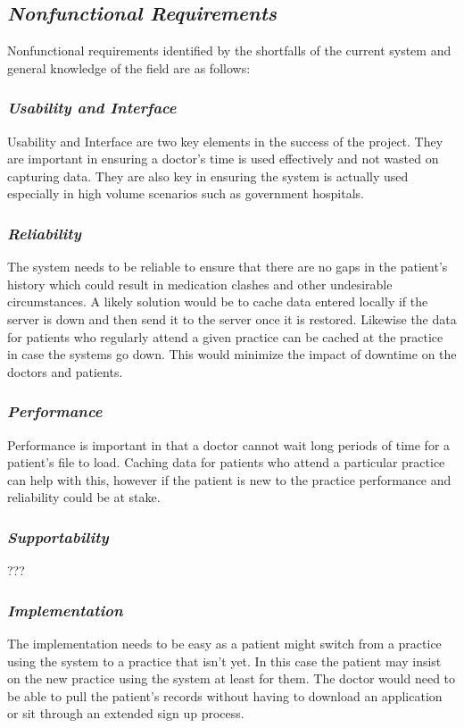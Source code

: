 \documentclass[a4paper]{article}
\begin{document}
\subsection{\textit{Nonfunctional Requirements}}
Nonfunctional requirements identified by the shortfalls of the current system and general knowledge of the field are as follows:
	\subsubsection{\textit{Usability and Interface}}
	Usability and Interface are two key elements in the success of the project. They are important in ensuring a doctor's time is used effectively and not wasted on capturing data. They are also key in ensuring the system is actually used especially in high volume scenarios such as government hospitals.
	
	\subsubsection{\textit{Reliability}}
	The system needs to be reliable to ensure that there are no gaps in the patient's history which could result in medication clashes and other undesirable circumstances. A likely solution would be to cache data entered locally if the server is down and then send it to the server once it is restored. Likewise the data for patients who regularly attend a given practice can be cached at the practice in case the systems go down. This would minimize the impact of downtime on the doctors and patients.
	
	\subsubsection{\textit{Performance}}
	Performance is important in that a doctor cannot wait long periods of time for a patient's file to load. Caching data for patients who attend a particular practice can help with this, however if the patient is new to the practice performance and reliability could be at stake.
	
	\subsubsection{\textit{Supportability}}
	???
	
	\subsubsection{\textit{Implementation}}
	The implementation needs to be easy as a patient might switch from a practice using the system to a practice that isn't yet. In this case the patient may insist on the new practice using the system at least for them. The doctor would need to be able to pull the patient's records without having to download an application or sit through an extended sign up process.
	
\end{document}
